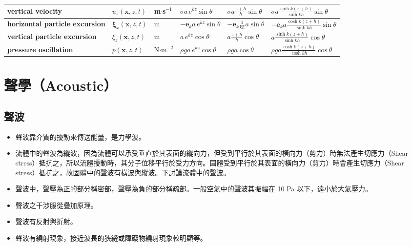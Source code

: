\documentclass[a4paper,12pt]{report}
\begin{document}
\begin{longtable}[c]{|p{}|p{}|p{}|p{}|p{}|p{}|}
\hline
\textbf{vertical velocity} & $u_z(\mathbf{x},z,t)$ & m$\cdot$s$^{-1}$ & $\sigma a\, e^{k z} \sin \theta$ & $\sigma a \frac{z + h}{h} \sin \theta$ & $\sigma a \frac{\sinh k (z+h) }{\sinh k h} \sin \theta$ \\
\hline
\textbf{horizontal particle excursion} & $\boldsymbol{\xi}_x(\mathbf{x},z,t)$ & m & $-\mathbf{e}_k a\, e^{k z} \sin \theta$ & $-\mathbf{e}_k \frac{1}{k h} a \sin \theta$ & $-\mathbf{e}_k a \frac{\cosh k (z+h) }{\sinh k h} \sin \theta$ \\
\hline
\textbf{vertical particle excursion} & $\xi_z(\mathbf{x},z,t)$ & m & $a\, e^{k z} \cos \theta$ & $a \frac{z + h}{h} \cos \theta$ & $a \frac{\sinh k (z+h) }{\sinh k h} \cos \theta$ \\
\hline
\textbf{pressure oscillation} & $p(\mathbf{x},z,t)$ & N$\cdot$m$^{-2}$ & $\rho g a\, e^{k z} \cos \theta$ & $\rho g a \cos \theta$ & $\rho g a \frac{\cosh k (z+h) }{\cosh k h} \cos \theta$ \\
\hline
\end{longtable}\FB


\section{聲學（Acoustic）}
\subsection {聲波}
\begin{itemize}
\item 聲波靠介質的擾動來傳送能量，是力學波。
\item 流體中的聲波為縱波，因為流體可以承受垂直於其表面的縱向力，但受到平行於其表面的橫向力（剪力）時無法產生切應力（Shear stress）抵抗之，所以流體擾動時，其分子位移平行於受力方向。固體受到平行於其表面的橫向力（剪力）時會產生切應力（Shear stress）抵抗之，故固體中的聲波有橫波與縱波。下討論流體中的聲波。
\item 聲波中，聲壓為正的部分稱密部，聲壓為負的部分稱疏部。一般空氣中的聲波其振幅在 10 Pa 以下，遠小於大氣壓力。
\item 聲波之干涉服從疊加原理。
\item 聲波有反射與折射。
\item 聲波有繞射現象，接近波長的狹縫或障礙物繞射現象較明顯等。
\end{itemize}
\end{document}
